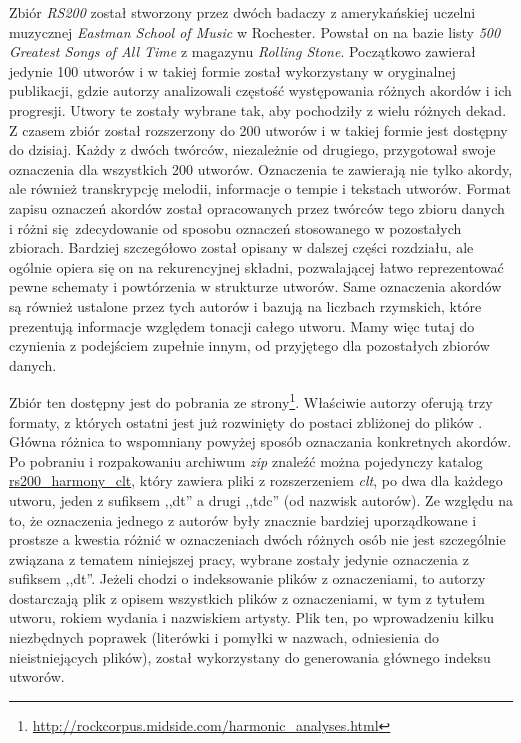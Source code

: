 Zbiór \emph{RS200} \cite{de_clercq_corpus_2011} został stworzony przez dwóch badaczy z amerykańskiej uczelni muzycznej \emph{Eastman School of Music} w Rochester. Powstał on na bazie listy \emph{500 Greatest Songs of All Time} z magazynu \emph{Rolling Stone}. Początkowo zawierał jedynie 100 utworów i w takiej formie został wykorzystany w oryginalnej publikacji, gdzie autorzy analizowali częstość występowania różnych akordów i ich progresji. Utwory te zostały wybrane tak, aby pochodziły z wielu różnych dekad. Z czasem zbiór został rozszerzony do 200 utworów i w takiej formie jest dostępny do dzisiaj. Każdy z dwóch twórców, niezależnie od drugiego, przygotował swoje oznaczenia dla wszystkich 200 utworów. Oznaczenia te zawierają nie tylko akordy, ale również transkrypcję melodii, informacje o tempie i tekstach utworów. Format zapisu oznaczeń akordów został opracowanych przez twórców tego zbioru danych i różni się zdecydowanie od sposobu oznaczeń stosowanego w pozostałych zbiorach.  Bardziej szczegółowo został opisany w dalszej części rozdziału, ale ogólnie opiera się on na rekurencyjnej składni, pozwalającej łatwo reprezentować pewne schematy i powtórzenia w strukturze utworów. Same oznaczenia akordów są również ustalone przez tych autorów i bazują na liczbach rzymskich, które prezentują informacje względem tonacji całego utworu. Mamy więc tutaj do czynienia z podejściem zupełnie innym, od przyjętego dla pozostałych zbiorów danych.

Zbiór ten dostępny jest do pobrania ze strony\footnote{\url{http://rockcorpus.midside.com/harmonic_analyses.html}}. Właściwie autorzy oferują trzy formaty, z których ostatni jest już rozwinięty do postaci zbliżonej do plików . Główna różnica to wspomniany powyżej sposób oznaczania konkretnych akordów. Po pobraniu i rozpakowaniu archiwum \emph{zip} znaleźć można pojedynczy katalog \url{rs200_harmony_clt}, który zawiera pliki z rozszerzeniem \emph{clt}, po dwa dla każdego utworu, jeden z sufiksem ,,dt'' a drugi ,,tdc'' (od nazwisk autorów). Ze względu na to, że oznaczenia jednego z autorów były znacznie bardziej uporządkowane i prostsze a kwestia różnić w oznaczeniach dwóch różnych osób nie jest szczególnie związana z tematem niniejszej pracy, wybrane zostały jedynie oznaczenia z sufiksem ,,dt''. Jeżeli chodzi o indeksowanie plików z oznaczeniami, to autorzy dostarczają plik  z opisem wszystkich plików z oznaczeniami, w tym z tytułem utworu, rokiem wydania i nazwiskiem artysty. Plik ten, po wprowadzeniu kilku niezbędnych poprawek (literówki i pomyłki w nazwach, odniesienia do nieistniejących plików), został wykorzystany do generowania głównego indeksu utworów.

